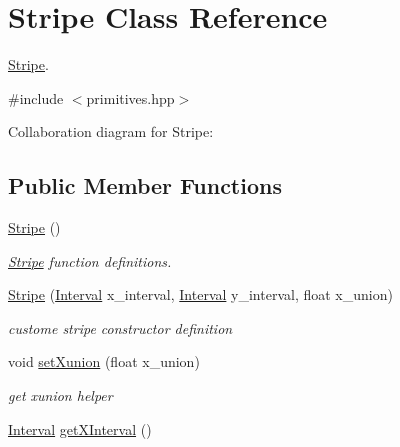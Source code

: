\hypertarget{classStripe}{}\section{Stripe Class Reference}
\label{classStripe}


\hyperlink{classStripe}{Stripe}.  




{\ttfamily \#include $<$primitives.\+hpp$>$}



Collaboration diagram for Stripe\+:
\subsection*{Public Member Functions}
\begin{DoxyCompactItemize}
\item 
\mbox{\label{classStripe_a204f4b149ca011c6b297fd5c27a9523d}} 
\hyperlink{classStripe_a204f4b149ca011c6b297fd5c27a9523d}{Stripe} ()
\begin{DoxyCompactList}\small\item\em \hyperlink{classStripe}{Stripe} function definitions. \end{DoxyCompactList}\item 
\mbox{\label{classStripe_a9b6052e4c76194fca4805c63a8c9334b}} 
\hyperlink{classStripe_a9b6052e4c76194fca4805c63a8c9334b}{Stripe} (\hyperlink{classInterval}{Interval} x\+\_\+interval, \hyperlink{classInterval}{Interval} y\+\_\+interval, float x\+\_\+union)
\begin{DoxyCompactList}\small\item\em custome stripe constructor definition \end{DoxyCompactList}\item 
\mbox{\label{classStripe_a306bdc2d48b64b1d8ba45c4f86faf6a2}} 
void \hyperlink{classStripe_a306bdc2d48b64b1d8ba45c4f86faf6a2}{set\+Xunion} (float x\+\_\+union)
\begin{DoxyCompactList}\small\item\em get xunion helper \end{DoxyCompactList}\item 
\mbox{\label{classStripe_ac29118cb6f4d6f8b684f39bbb1d550cb}} 
\hyperlink{classInterval}{Interval} \hyperlink{classStripe_ac29118cb6f4d6f8b684f39bbb1d550cb}{get\+X\+Interval} ()

\end{DoxyCompactItemize}
